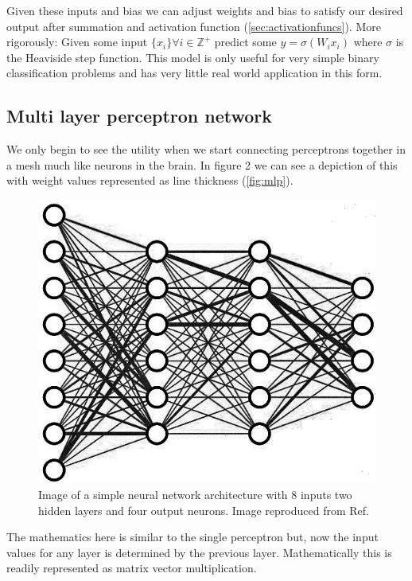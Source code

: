 \documentclass{article}
\begin{document}
Given these inputs and bias we can adjust weights and bias to satisfy our desired output after summation and activation function (\ref{sec:activationfuncs}). 
More rigorously: Given some input $\{x_i\} \forall i\in \mathbb{Z^+}$ predict some $y=\sigma(W_i x_i)$ where $\sigma$ is the Heaviside step function. This model is only useful for very simple binary classification problems and has very little real world application in this form.

\pagebreak

\subsection{Multi layer perceptron network}
\label{sec:mlp}
We only begin to see the utility when we start connecting perceptrons together in a mesh much like neurons in the brain. In figure 2 we can see a depiction of this with weight values represented as line thickness (\autoref{fig:mlp}). 
\begin{figure}[H]
\caption{Image of a simple neural network architecture with 8 inputs two hidden layers and four output neurons. Image reproduced from Ref.\cite{3blue1brown}}
\label{fig:mlp}
\includegraphics[scale=2]{nn.jpg}
\end{figure}
The mathematics here is similar to the single perceptron but, now the input values for any layer is determined by the previous layer. Mathematically this is readily represented as matrix vector multiplication. 
\end{document}
